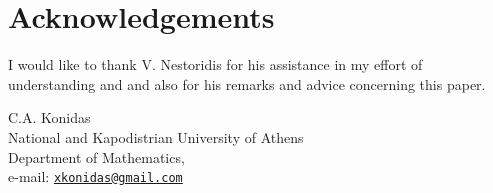 \documentclass[twoside, 11pt]{article}
\theoremstyle{plain}
\theoremstyle{definition}
\begin{document}
\section*{\fontsize{11}{15}\selectfont Acknowledgements}
I would like to thank V. Nestoridis for his assistance in my effort of understanding \cite{BIEHLER2} and \cite{BIEHLER1} and also for his remarks and advice concerning this paper.

\printbibliography
%
\bigskip
\noindent
%
C.A. Konidas\\
%
National and Kapodistrian University of Athens\\
%
Department of Mathematics,\\
%
e-mail:
%
\href{mailto:xkonidas@gmail.com}{\tt xkonidas@gmail.com}
\end{document}
